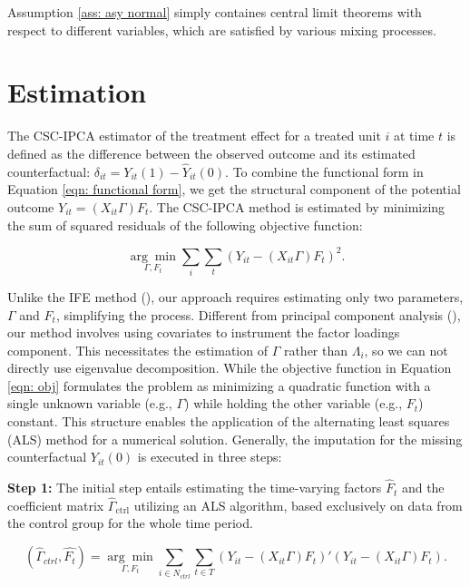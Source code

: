 \documentclass[12pt]{article}
\begin{document}
Assumption \ref{ass: asy normal} simply containes central limit theorems with respect to different variables, which are satisfied by various mixing processes.

\section{Estimation}
\label{sec: estimation}
The CSC-IPCA estimator of the treatment effect for a treated unit $i$ at time $t$ is defined as the difference between the observed outcome and its estimated counterfactual: $\delta_{it} = Y_{it}(1) - \hat{Y}_{it}(0)$. To combine the functional form in Equation \ref{eqn: functional form}, we get the structural component of the potential outcome $Y_{it} = (X_{it}\Gamma) F_{t}$. The CSC-IPCA method is estimated by minimizing the sum of squared residuals of the following objective function:

\begin{equation}
\label{eqn: obj}
\underset{\Gamma, F_t}{\arg\min} \sum_{i} \sum_{t}\left( Y_{it} - (X_{it}\Gamma) F_{t} \right)^2.
\end{equation}

Unlike the IFE method (\cite{bai2009panel}), our approach requires estimating only two parameters, $\Gamma$ and $F_t$, simplifying the process. Different from principal component analysis (\cite{jolliffe2002principal}), our method involves using covariates to instrument the factor loadings component. This necessitates the estimation of $\Gamma$ rather than $\Lambda_i$, so we can not directly use eigenvalue decomposition. While the objective function in Equation \ref{eqn: obj} formulates the problem as minimizing a quadratic function with a single unknown variable (e.g., $\Gamma$) while holding the other variable (e.g., $F_t$) constant. This structure enables the application of the alternating least squares (ALS) method for a numerical solution. Generally, the imputation for the missing counterfactual $Y_{it}(0)$ is executed in three steps:

\textbf{Step 1:} The initial step entails estimating the time-varying factors $\hat{F}_t$ and the coefficient matrix $\hat{\Gamma}_{\text{ctrl}}$ utilizing an ALS algorithm, based exclusively on data from the control group for the whole time period.

\begin{equation}
(\hat{\Gamma}_{ctrl}, \hat{F_t}) = \underset{\Gamma, F_t}{\arg\min} \sum_{i \in N_{ctrl}} \sum_{t \in T}\left( Y_{it} - (X_{it}\Gamma) F_{t} \right)'\left( Y_{it} - (X_{it}\Gamma) F_{t} \right).
\tag{3}
\label{eq: optimization}
\end{equation}
\end{document}
